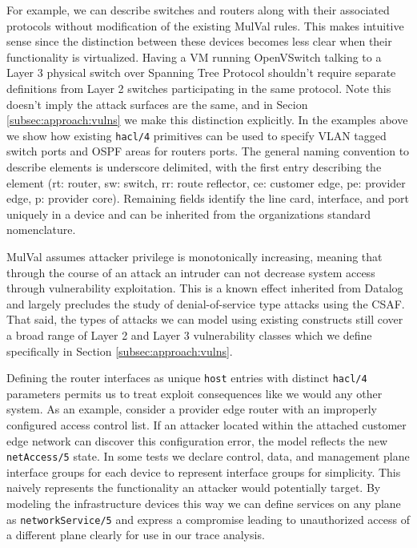 
For example, we can describe switches and routers along with their associated protocols without modification of the existing MulVal rules. This makes intuitive sense since the distinction between these devices becomes less clear when their functionality is virtualized. Having a VM running OpenVSwitch talking to a Layer 3 physical switch over Spanning Tree Protocol shouldn't require separate definitions from Layer 2 switches participating in the same protocol. Note this doesn't imply the attack surfaces are the same, and in Secion \ref{subsec:approach:vulns} we make this distinction explicitly. In the examples above we show how existing \verb|hacl/4| primitives can be used to specify VLAN tagged switch ports and OSPF areas for routers ports. The general naming convention to describe elements is underscore delimited, with the first entry describing the element (rt: router, sw: switch, rr: route reflector, ce: customer edge, pe: provider edge, p: provider core). Remaining fields identify the line card, interface, and port uniquely in a device and can be inherited from the organizations standard nomenclature. 

MulVal assumes attacker privilege is monotonically increasing, meaning that through the course of an attack an intruder can not decrease system access through vulnerability exploitation. This is a known\cite[Ch 2.6]{Ou_Appel_2005} effect inherited from Datalog and largely precludes the study of denial-of-service type attacks using the CSAF. That said, the types of attacks we can model using existing constructs still cover a broad range of Layer 2 and Layer 3 vulnerability classes which we define specifically in Section \ref{subsec:approach:vulns}.  


Defining the router interfaces as unique \verb|host| entries with distinct \verb|hacl/4| parameters permits us to treat exploit consequences like we would any other system. As an example, consider a provider edge router with an improperly configured access control list. If an attacker located within the attached customer edge network can discover this configuration error, the model reflects the new \verb|netAccess/5| state. In some tests we declare control, data, and management plane interface groups for each device to represent interface groups for simplicity. This naively represents the functionality an attacker would potentially target. By modeling the infrastructure devices this way we can define services on any plane as \verb|networkService/5| and express a compromise leading to unauthorized access of a different plane clearly for use in our trace analysis. 

